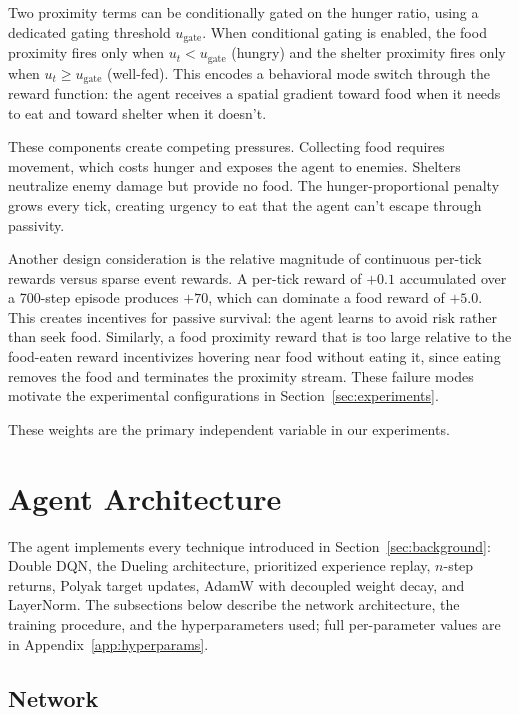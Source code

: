 \documentclass[12pt,a4paper,titlepage]{article}
\begin{document}
Two proximity terms can be conditionally gated on the hunger ratio, using a dedicated gating threshold $u_\text{gate}$. When conditional gating is enabled, the food proximity fires only when $u_t < u_\text{gate}$ (hungry) and the shelter proximity fires only when $u_t \geq u_\text{gate}$ (well-fed). This encodes a behavioral mode switch through the reward function: the agent receives a spatial gradient toward food when it needs to eat and toward shelter when it doesn't.

These components create competing pressures. Collecting food requires movement, which costs hunger and exposes the agent to enemies. Shelters neutralize enemy damage but provide no food. The hunger-proportional penalty grows every tick, creating urgency to eat that the agent can't escape through passivity.

Another design consideration is the relative magnitude of continuous per-tick rewards versus sparse event rewards. A per-tick reward of $+0.1$ accumulated over a 700-step episode produces $+70$, which can dominate a food reward of $+5.0$. This creates incentives for passive survival: the agent learns to avoid risk rather than seek food. Similarly, a food proximity reward that is too large relative to the food-eaten reward incentivizes hovering near food without eating it, since eating removes the food and terminates the proximity stream. These failure modes motivate the experimental configurations in Section~\ref{sec:experiments}.

These weights are the primary independent variable in our experiments.

\section{Agent Architecture}
\label{sec:architecture}

The agent implements every technique introduced in Section~\ref{sec:background}: Double DQN, the Dueling architecture, prioritized experience replay, $n$-step returns, Polyak target updates, AdamW with decoupled weight decay, and LayerNorm. The subsections below describe the network architecture, the training procedure, and the hyperparameters used; full per-parameter values are in Appendix~\ref{app:hyperparams}.

\subsection{Network}
\label{sec:network}
\end{document}
